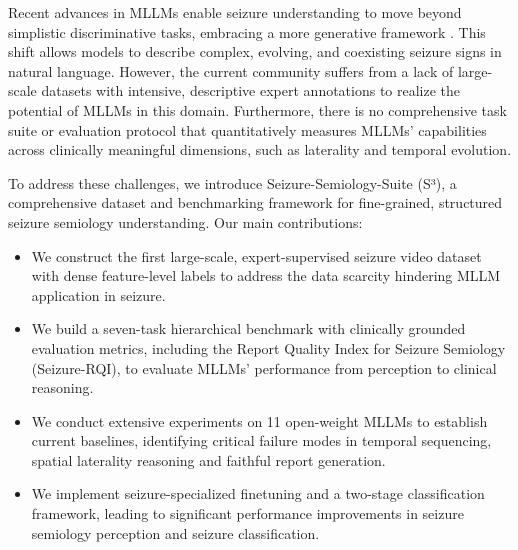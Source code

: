 \documentclass{article}
\theoremstyle{plain}
\theoremstyle{definition}
\theoremstyle{remark}
\begin{document}
Recent advances in MLLMs enable seizure understanding to move beyond simplistic discriminative tasks, embracing a more generative framework \cite{bai2025Qwen2_5_vl, wang2025internVL3_5, yang2025qwen3}. This shift allows models to describe complex, evolving, and coexisting seizure signs in natural language. However, the current community suffers from a lack of large-scale datasets with intensive, descriptive expert annotations to realize the potential of MLLMs in this domain. Furthermore, there is no comprehensive task suite or evaluation protocol that quantitatively measures MLLMs’ capabilities across clinically meaningful dimensions, such as laterality and temporal evolution.

To address these challenges, we introduce Seizure-Semiology-Suite (S³), a comprehensive dataset and benchmarking framework for fine-grained, structured seizure semiology understanding. Our main contributions:
\begin{itemize}
    \item We construct the first large-scale, expert-supervised seizure video dataset with dense feature-level labels to address the data scarcity hindering MLLM application in seizure.
    \item We build a seven-task hierarchical benchmark with clinically grounded evaluation metrics, including the Report Quality Index for Seizure Semiology (Seizure-RQI), to evaluate MLLMs' performance from perception to clinical reasoning.
    \item We conduct extensive experiments on 11 open-weight MLLMs to establish current baselines, identifying critical failure modes in temporal sequencing, spatial laterality reasoning and faithful report generation.
    \item We implement seizure-specialized finetuning and a two-stage classification framework, leading to significant performance improvements in seizure semiology perception and seizure classification.

\end{itemize}
\end{document}
